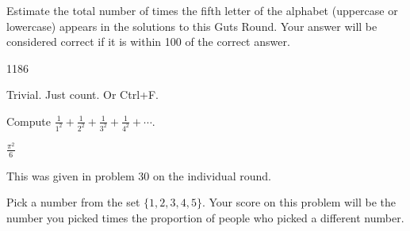\documentclass[11pt]{article}
\begin{document}
\begin{problem}
Estimate the total number of times the fifth letter of the alphabet (uppercase or lowercase) appears in the solutions to this Guts Round. Your answer will be considered correct if it is within 100 of the correct answer.
\end{problem}

\begin{answer}
1186
\end{answer}

\begin{solution}
Trivial. Just count. Or Ctrl+F.
\end{solution}

\begin{problem}
Compute $\frac{1}{1^2} + \frac{1}{2^2} + \frac{1}{3^2} + \frac{1}{4^2} + \cdots$.
\end{problem}

\begin{answer}
$\frac{\pi^2}{6}$
\end{answer}

\begin{solution}
This was given in problem 30 on the individual round.
\end{solution}


\begin{problem}
Pick a number from the set $\{1, 2, 3, 4, 5\}$. Your score on this problem will be the number you picked times the proportion of people who picked a different number.
\end{problem}
\end{document}
